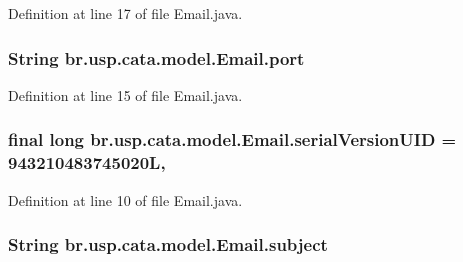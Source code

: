 Definition at line 17 of file Email.\+java.

\hypertarget{classbr_1_1usp_1_1cata_1_1model_1_1_email_a6dfbe1e23003fbd851bce14c0568dcf8}{
\subsubsection[{port}]{\setlength{\rightskip}{0pt plus 5cm}String br.\+usp.\+cata.\+model.\+Email.\+port\hspace{0.3cm}{\ttfamily [private]}}}\label{classbr_1_1usp_1_1cata_1_1model_1_1_email_a6dfbe1e23003fbd851bce14c0568dcf8}


Definition at line 15 of file Email.\+java.

\hypertarget{classbr_1_1usp_1_1cata_1_1model_1_1_email_a9db623d01d0113f9dab5305f1ddb435d}{
\subsubsection[{serial\+Version\+U\+I\+D}]{\setlength{\rightskip}{0pt plus 5cm}final long br.\+usp.\+cata.\+model.\+Email.\+serial\+Version\+U\+I\+D = 943210483745020\+L\hspace{0.3cm}{\ttfamily [static]}, {\ttfamily [private]}}}\label{classbr_1_1usp_1_1cata_1_1model_1_1_email_a9db623d01d0113f9dab5305f1ddb435d}


Definition at line 10 of file Email.\+java.

\hypertarget{classbr_1_1usp_1_1cata_1_1model_1_1_email_a4c5ca463c3db38d15f893ed8e2ec8f8f}{
\subsubsection[{subject}]{\setlength{\rightskip}{0pt plus 5cm}String br.\+usp.\+cata.\+model.\+Email.\+subject\hspace{0.3cm}{\ttfamily [private]}}}\label{classbr_1_1usp_1_1cata_1_1model_1_1_email_a4c5ca463c3db38d15f893ed8e2ec8f8f}


